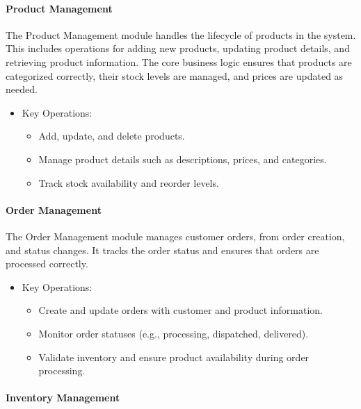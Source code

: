 \documentclass{llncs}
\begin{document}
\paragraph{Product Management} \leavevmode

The Product Management module handles the lifecycle of products in the system. This includes operations for adding new products, updating product details, and retrieving product information. The core business logic ensures that products are categorized correctly, their stock levels are managed, and prices are updated as needed.
\begin{itemize}
    \item Key Operations:
          \begin{itemize}
              \item Add, update, and delete products.
              \item Manage product details such as descriptions, prices, and categories.
              \item Track stock availability and reorder levels.
          \end{itemize}
\end{itemize}

\paragraph{Order Management} \leavevmode

The Order Management module manages customer orders, from order creation, and status changes. It tracks the order status and ensures that orders are processed correctly.
\begin{itemize}
    \item Key Operations:
          \begin{itemize}
              \item Create and update orders with customer and product information.
              \item Monitor order statuses (e.g., processing, dispatched, delivered).
              \item Validate inventory and ensure product availability during order processing.
          \end{itemize}
\end{itemize}

\paragraph{Inventory Management} \leavevmode
\end{document}
